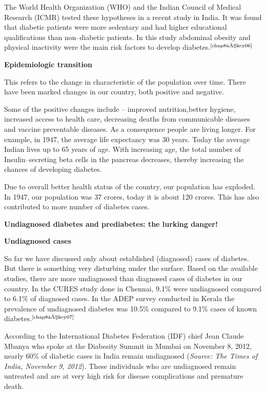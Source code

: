 The World Health Organization (WHO) and the Indian Council of Medical Research (ICMR) tested these hypotheses in a recent study in India. It was found that diabetic patients were more sedentary and had higher educational qualifications than non–diabetic patients. In this study abdominal obesity and physical inactivity were the main risk factors to develop diabetes.$^{\text{\cite{chap8–key06}}}$

\vskip 8pt
\noindent\textbf{Epidemiologic transition}

\vskip 8pt
This refers to the change in characteristic of the population over time. There have been marked changes in our country, both positive and negative.

Some of the positive changes include – improved nutrition,\break better hygiene, increased access to health care, decreasing deaths from communicable diseases and vaccine preventable diseases. As a consequence people are living longer. For example, in 1947, the ave\-rage life expectancy was 30 years. Today the average Indian lives up to 65 years of age. With increasing age, the total number of Insulin–secreting beta cells in the pancreas decreases, thereby increasing the chances of deve\-loping diabetes.

Due to overall better health status of the country, our population has exploded. In 1947, our population was 37 crores, today it is about 120 crores. This has also contributed to more number of diabetes cases.

\vskip 6pt
\noindent\textbf{Undiagnosed diabetes and prediabetes: the lurking danger!}

\vskip 6pt
\noindent\textbf{Undiagnosed cases}

So far we have discussed only about established (diagnosed) cases of diabetes. But there is something very disturbing under the surface. Based on the available studies, there are more undiagnosed than dia\-gnosed cases of diabetes in our country. In the CURES study done in Chennai, 9.1\% were undiagnosed compared to 6.1\% of diagnosed cases. In the ADEP survey conducted in Kerala the prevalence of undiagnosed diabetes was 10.5\% compared to 9.1\% cases of known diabetes.$^{\text{\cite{chap8–key07}}}$

According to the International Diabetes Federation (IDF) chief Jean Claude Mbanya who spoke at the Diabesity Summit in Mumbai on Nove\-mber 8, 2012, nearly 60\% of diabetic cases in India remain undiagnosed (\textit{Source: The Times of India, November 9, 2012}). These individuals who are undiagnosed remain untreated and are at very high risk for disease complications and premature death.

